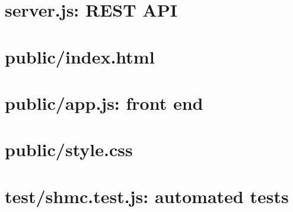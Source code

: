 \documentclass[11pt,a4paper]{report}
\begin{document}
\section{server.js: REST API}
\section{public/index.html}
\section{public/app.js: front end}
\section{public/style.css}
\section{test/shmc.test.js: automated tests}
\end{document}

